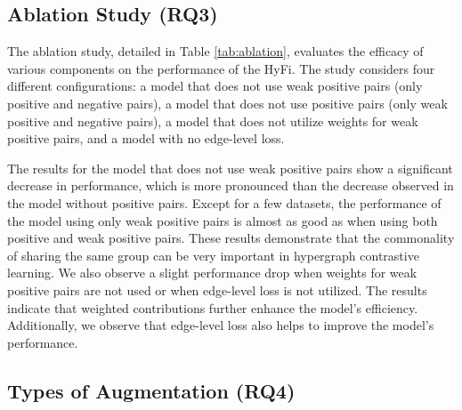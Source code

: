 \subsection{Ablation Study (RQ3)} 

The ablation study, detailed in Table \ref{tab:ablation}, evaluates the efficacy of various components on the performance of the HyFi. The study considers four different configurations: a model that does not use weak positive pairs (only positive and negative pairs), a model that does not use positive pairs (only weak positive and negative pairs), a model that does not utilize weights for weak positive pairs, and a model with no edge-level loss.

The results for the model that does not use weak positive pairs show a significant decrease in performance, which is more pronounced than the decrease observed in the model without positive pairs. Except for a few datasets, the performance of the model using only weak positive pairs is almost as good as when using both positive and weak positive pairs. These results demonstrate that the commonality of sharing the same group can be very important in hypergraph contrastive learning. We also observe a slight performance drop when weights for weak positive pairs are not used or when edge-level loss is not utilized. The results indicate that weighted contributions further enhance the model's efficiency. Additionally, we observe that edge-level loss also helps to improve the model's performance.


\subsection{Types of Augmentation (RQ4)}



